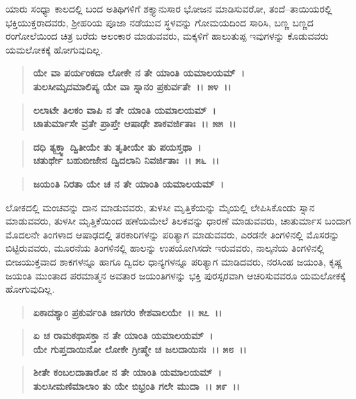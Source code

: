 ಯಾರು ಸಂಧ್ಯಾ ಕಾಲದಲ್ಲಿ ಬಂದ ಅತಿಥಿಗಳಿಗೆ ಶಕ್ತ್ಯಾನುಸಾರ ಭೋಜನ ಮಾಡಿಸುವರೋ, ತಂದೆ–ತಾಯಿಯರಲ್ಲಿ ಭಕ್ತಿಯುಕ್ತರಾದವರು, ಶ‍್ರೀಹರಿಯ ಪೂಜಾ ನಡೆಯುವ ಸ್ಥಳವನ್ನು ಗೋಮಯದಿಂದ ಸಾರಿಸಿ, ಬಣ್ಣ ಬಣ್ಣದ ರಂಗೋಲೆಯಿಂದ ಚಿತ್ರ ಬರೆದು ಅಲಂಕಾರ ಮಾಡುವವರು, ಮಕ್ಕಳಿಗೆ ಹಾಲುತುಪ್ಪ ಇವುಗಳನ್ನು ಕೊಡುವವರು ಯಮಲೋಕಕ್ಕೆ ಹೋಗುವುದಿಲ್ಲ.

\begin{verse}
\textbf{ಯೇ ವಾ ಪರ್ಯಂಕದಾ ಲೋಕೇ ನ ತೇ ಯಾಂತಿ ಯಮಾಲಯಮ್~।}\\\textbf{ತುಲಸೀಮೃದಮಾಲಿಪ್ಯ ಯೇ ವಾ ಸ್ನಾನಂ ಪ್ರಕುರ್ವತೇ~।। ೫೪~।। }
\end{verse}

\begin{verse}
\textbf{ಲಲಾಟೇ ತಿಲಕಂ ವಾಪಿ ನ ತೇ ಯಾಂತಿ ಯಮಾಲಯಮ್~।}\\\textbf{ಚಾತುರ್ಮಾಸೇ ವ್ರತೇ ಪ್ರಾಪ್ತೇ ಆಷಾಢೇ ಶಾಕವರ್ಜಿತಾಃ~।। ೫೫~।।} 
\end{verse}

\begin{verse}
\textbf{ದಧಿ ತ್ಯಕ್ತ್ವಾ ದ್ವಿತೀಯೇ ತು ತೃತೀಯೇ ತು ಪಯಸ್ತಥಾ~।}\\\textbf{ಚತುರ್ಥೇ ಬಹುಬೀಜೇನ ದ್ವಿದಲಾನಿ ನಿವರ್ಜಿತಾಃ~।। ೫೬~।। }
\end{verse}

\begin{verse}
\textbf{ಜಯಂತಿ ನಿರತಾ ಯೇ ಚ ನ ತೇ ಯಾಂತಿ ಯಮಾಲಯಮ್~।}
\end{verse}

ಲೋಕದಲ್ಲಿ ಮಂಚವನ್ನು ದಾನ ಮಾಡುವವರು, ತುಳಸೀ ಮೃತ್ತಿಕೆಯನ್ನು ಮೈಯಲ್ಲಿ ಲೇಪಿಸಿಕೊಂಡು ಸ್ನಾನ ಮಾಡುವವರು, ತುಳಸೀ ಮೃತ್ತಿಕೆಯಿಂದ ಹಣೆಯಮೇಲೆ ತಿಲಕವನ್ನು ಧಾರಣೆ ಮಾಡುವವರು, ಚಾತುರ್ಮಾಸ ಬಂದಾಗ ಮೊದಲನೇ ತಿಂಗಳಾದ ಆಷಾಢದಲ್ಲಿ ತರಕಾರಿಗಳನ್ನು ಪರಿತ್ಯಾಗ ಮಾಡುವವರು, ಎರಡನೇ ತಿಂಗಳಿನಲ್ಲಿ ಮೊಸರನ್ನು ಬಿಟ್ಟಿರುವವರು, ಮೂರನೆಯ ತಿಂಗಳಿನಲ್ಲಿ ಹಾಲನ್ನು ಉಪಯೋಗಿಸದೇ ಇರುವವರು, ನಾಲ್ಕನೆಯ ತಿಂಗಳಿನಲ್ಲಿ ಬೀಜಯುಕ್ತವಾದ ಶಾಕಗಳನ್ನೂ ಹಾಗೂ ದ್ವಿದಲ ಧಾನ್ಯಗಳನ್ನೂ ಪರಿತ್ಯಾಗ ಮಾಡಿದವರು, ನರಸಿಂಹ ಜಯಂತಿ, ಕೃಷ್ಣ ಜಯಂತಿ ಮುಂತಾದ ಪರಮಾತ್ಮನ ಅವತಾರ ಜಯಂತಿಗಳನ್ನು ಭಕ್ತಿ ಪುರಸ್ಸರವಾಗಿ ಆಚರಿಸುವವರೂ ಯಮಲೋಕಕ್ಕೆ ಹೋಗುವುದಿಲ್ಲ.

\begin{verse}
\textbf{ಏಕಾದಶ್ಯಾಂ ಪ್ರಕುರ್ವಂತಿ ಜಾಗರಂ ಕೇಶವಾಲಯೇ~।। ೫೭~।। }
\end{verse}

\begin{verse}
\textbf{ಏ ಚ ರಾಮಕಥಾಸಕ್ತಾ ನ ತೇ ಯಾಂತಿ ಯಮಾಲಯಮ್~।}\\\textbf{ಯೇ ಗುಪ್ತದಾಯಿನೋ ಲೋಕೇ ಗ್ರೀಷ್ಮೇ ಚ ಜಲದಾಯಿನಃ~।। ೫೮~।। }
\end{verse}

\begin{verse}
\textbf{ಶೀತೇ ಕಂಬಲದಾತಾರೋ ನ ತೇ ಯಾಂತಿ ಯಮಾಲಯಮ್~।}\\\textbf{ತುಲಸೀಮಣಿಮಾಲಾಂ ತು ಯೇ ಬಿಭ್ರಂತಿ ಗಲೇ ಮುದಾ~।। ೫೯~।। }
\end{verse}

